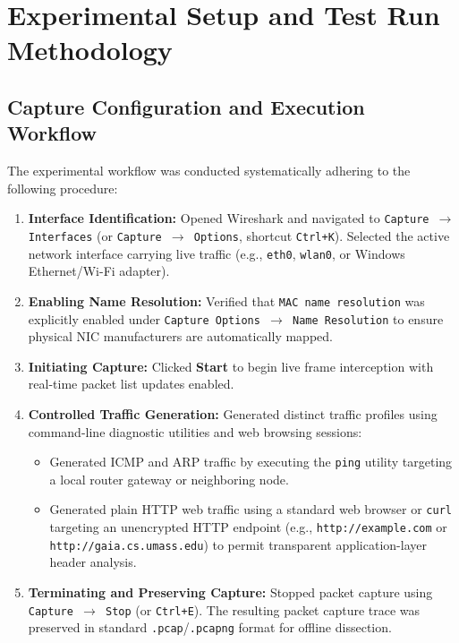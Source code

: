 \documentclass[12pt, a4paper]{article}
\begin{document}
\section{Experimental Setup and Test Run Methodology}

\subsection{Capture Configuration and Execution Workflow}
The experimental workflow was conducted systematically adhering to the following procedure:
\begin{enumerate}
    \item \textbf{Interface Identification:} Opened Wireshark and navigated to \texttt{Capture $\rightarrow$ Interfaces} (or \texttt{Capture $\rightarrow$ Options}, shortcut \texttt{Ctrl+K}). Selected the active network interface carrying live traffic (e.g., \texttt{eth0}, \texttt{wlan0}, or Windows Ethernet/Wi-Fi adapter).
    \item \textbf{Enabling Name Resolution:} Verified that \texttt{MAC name resolution} was explicitly enabled under \texttt{Capture Options $\rightarrow$ Name Resolution} to ensure physical NIC manufacturers are automatically mapped.
    \item \textbf{Initiating Capture:} Clicked \textbf{Start} to begin live frame interception with real-time packet list updates enabled.
    \item \textbf{Controlled Traffic Generation:} Generated distinct traffic profiles using command-line diagnostic utilities and web browsing sessions:
    \begin{itemize}
        \item Generated ICMP and ARP traffic by executing the \texttt{ping} utility targeting a local router gateway or neighboring node.
        \item Generated plain HTTP web traffic using a standard web browser or \texttt{curl} targeting an unencrypted HTTP endpoint (e.g., \texttt{http://example.com} or \texttt{http://gaia.cs.umass.edu}) to permit transparent application-layer header analysis.
    \end{itemize}
    \item \textbf{Terminating and Preserving Capture:} Stopped packet capture using \texttt{Capture $\rightarrow$ Stop} (or \texttt{Ctrl+E}). The resulting packet capture trace was preserved in standard \texttt{.pcap}/\texttt{.pcapng} format for offline dissection.
\end{enumerate}
\end{document}

